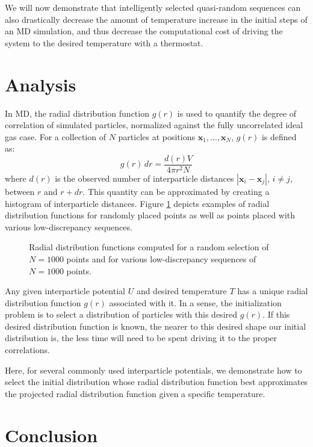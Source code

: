 \documentclass{article}
\begin{document}
We will now demonstrate that intelligently selected quasi-random sequences can also drastically decrease the amount of temperature increase in the initial steps of an MD simulation, and thus decrease the computational cost of driving the system to the desired temperature with a thermostat.

\section{Analysis}

In MD, the radial distribution function $g(r)$ is used to quantify the degree of correlation of simulated particles, normalized against the fully uncorrelated ideal gas case. For a collection of $N$ particles at positions $\mathbf{x}_1,\dots,\mathbf{x}_N$, $g(r)$ is defined as:
\begin{equation}
g(r)\,dr=\frac{d(r) V}{4\pi r^2 N}
\end{equation}where $d(r)$ is the observed number of interparticle distances $|\mathbf{x}_i-\mathbf{x}_j|$, $i\neq j$, between $r$ and $r+dr$. This quantity can be approximated by creating a histogram of interparticle distances. Figure \ref{fig:radialdist} depicts examples of radial distribution functions for randomly placed points as well as points placed with various low-discrepancy sequences.

\begin{figure}
\caption{Radial distribution functions computed for a random selection of $N=1000$ points and for various low-discrepancy sequences of $N=1000$ points.}
\label{fig:radialdist}
\end{figure}

Any given interparticle potential $U$ and desired temperature $T$ has a unique radial distribution function $g(r)$ associated with it. In a sense, the initialization problem is to select a distribution of particles with this desired $g(r)$. If this desired distribution function is known, the nearer to this desired shape our initial distribution is, the less time will need to be spent driving it to the proper correlations.

Here, for several commonly used interparticle potentials, we demonstrate how to select the initial distribution whose radial distribution function best approximates the projected radial distribution function given a specific temperature.

\section{Conclusion}
\end{document}
